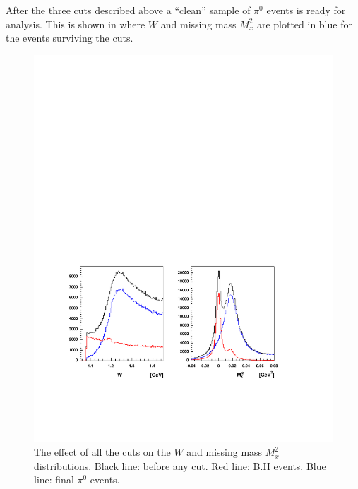 \cia
After the three cuts described above a ``clean'' sample of $\pi^0$ events is ready for analysis.
This is shown in  where $W$ and missing mass $M_x^2$ are plotted in blue for the events
surviving the cuts.


\begin{figure}[h]
 \begin{center}
 \includegraphics[width = 13cm, bb=60 110 520 460]{data_reduction/img/bh_mm_w} 
  \caption[The effect of all the cuts on the $W$ and missing mass $M_x^2$ distributions]
          { The effect of all the cuts on the $W$ and missing mass $M_x^2$ distributions. 
                     Black line: before any cut. Red line: B.H events. Blue line: final $\pi^0$ events.}
 \label{fig:bh_mm_w}
 \end{center}
\end{figure}












